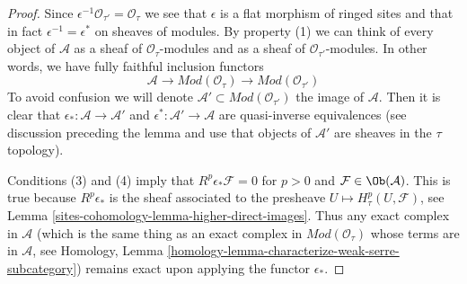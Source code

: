 \begin{proof}
Since $\epsilon^{-1}\mathcal{O}_{\tau'} = \mathcal{O}_\tau$
we see that $\epsilon$ is a flat morphism of ringed sites
and that in fact $\epsilon^{-1} = \epsilon^*$ on sheaves
of modules. By property (1) we can think of every object of
$\mathcal{A}$ as a sheaf of $\mathcal{O}_\tau$-modules
and as a sheaf of $\mathcal{O}_{\tau'}$-modules.
In other words, we have fully faithful inclusion functors
$$
\mathcal{A} \to \textit{Mod}(\mathcal{O}_\tau) \to
\textit{Mod}(\mathcal{O}_{\tau'})
$$
To avoid confusion we will denote
$\mathcal{A}' \subset \textit{Mod}(\mathcal{O}_{\tau'})$
the image of $\mathcal{A}$. Then it is clear that
$\epsilon_* : \mathcal{A} \to \mathcal{A}'$ and
$\epsilon^* : \mathcal{A}' \to \mathcal{A}$ are
quasi-inverse equivalences (see discussion preceding
the lemma and use that objects of $\mathcal{A}'$ are
sheaves in the $\tau$ topology).

\medskip\noindent
Conditions (3) and (4) imply that $R^p\epsilon_*\mathcal{F} = 0$
for $p > 0$ and $\mathcal{F} \in \Ob(\mathcal{A})$.
This is true because $R^p\epsilon_*$ is the sheaf associated
to the presheave $U \mapsto H^p_\tau(U, \mathcal{F})$, see
Lemma \ref{sites-cohomology-lemma-higher-direct-images}.
Thus any exact complex in $\mathcal{A}$ (which is the same thing
as an exact complex in $\textit{Mod}(\mathcal{O}_\tau)$
whose terms are in $\mathcal{A}$, see
Homology, Lemma \ref{homology-lemma-characterize-weak-serre-subcategory})
remains exact upon applying the functor $\epsilon_*$.


\end{proof}
